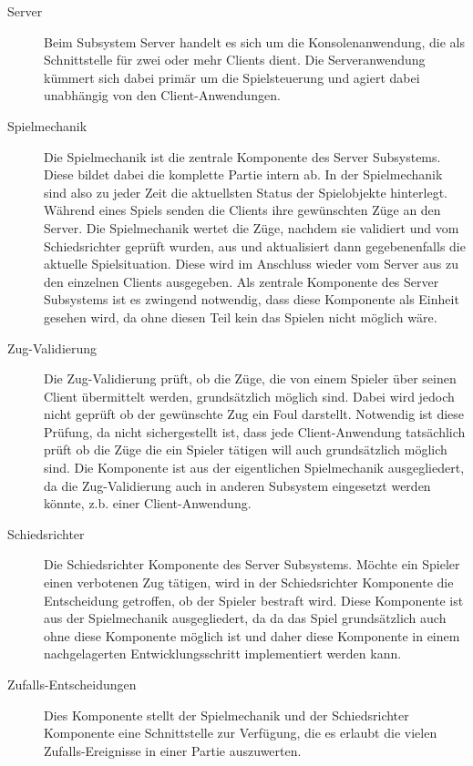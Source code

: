     \begin{description}
        
        \item[Server]
        Beim Subsystem Server handelt es sich um die Konsolenanwendung, die als Schnittstelle für zwei oder mehr Clients dient. Die Serveranwendung kümmert sich dabei primär um die Spielsteuerung und agiert dabei unabhängig von den Client-Anwendungen.
        
        \item[Spielmechanik]
        Die Spielmechanik ist die zentrale Komponente des Server Subsystems. Diese bildet dabei die komplette Partie intern ab. In der Spielmechanik sind also zu jeder Zeit die aktuellsten Status der Spielobjekte hinterlegt. Während eines Spiels senden die Clients ihre gewünschten Züge an den Server. Die Spielmechanik wertet die Züge, nachdem sie validiert und vom Schiedsrichter geprüft wurden, aus und aktualisiert dann gegebenenfalls die aktuelle Spielsituation. Diese wird im Anschluss wieder vom Server aus zu den einzelnen Clients ausgegeben. Als zentrale Komponente des Server Subsystems ist es zwingend notwendig, dass diese Komponente als Einheit gesehen wird, da ohne diesen Teil kein das Spielen nicht möglich wäre.
        
        \item[Zug-Validierung]
        Die Zug-Validierung prüft, ob die Züge, die von einem Spieler über seinen Client übermittelt werden, grundsätzlich möglich sind. Dabei wird jedoch nicht geprüft ob der gewünschte Zug ein Foul darstellt. Notwendig ist diese Prüfung, da nicht sichergestellt ist, dass jede Client-Anwendung tatsächlich prüft ob die Züge die ein Spieler tätigen will auch grundsätzlich möglich sind. Die Komponente ist aus der eigentlichen Spielmechanik ausgegliedert, da die Zug-Validierung auch in anderen Subsystem eingesetzt werden könnte, z.b. einer Client-Anwendung.			
        
        \item[Schiedsrichter]
        Die Schiedsrichter Komponente des Server Subsystems. Möchte ein Spieler einen verbotenen Zug tätigen, wird in der Schiedsrichter Komponente die Entscheidung getroffen, ob der Spieler bestraft wird. Diese Komponente ist aus der Spielmechanik ausgegliedert, da da das Spiel grundsätzlich auch ohne diese Komponente möglich ist und daher diese Komponente in einem nachgelagerten Entwicklungsschritt implementiert werden kann.
        
        \item[Zufalls-Entscheidungen]
        Dies Komponente stellt der Spielmechanik und der Schiedsrichter Komponente eine Schnittstelle zur Verfügung, die es erlaubt die vielen Zufalls-Ereignisse in einer Partie auszuwerten.
        

\end{description}
